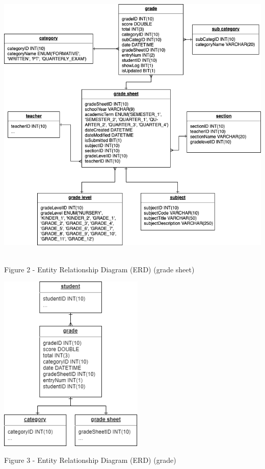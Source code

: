 \documentclass[11pt,a4paper,titlepage]{article}
\begin{document}
\vspace{1cm}
\begin{center}
    \includegraphics[height=13.5cm]{Grade-Sheet.png}
\end{center}
\vspace{1cm}
\begin{center}
    Figure 2 - Entity Relationship Diagram (ERD) (grade sheet)
\end{center}

\vspace{1cm}
\begin{center}
    \includegraphics[height=8.5cm]{Grade.png}
\end{center}
\vspace{1cm}
\begin{center}
    Figure 3 - Entity Relationship Diagram (ERD) (grade)
\end{center}
\end{document}
